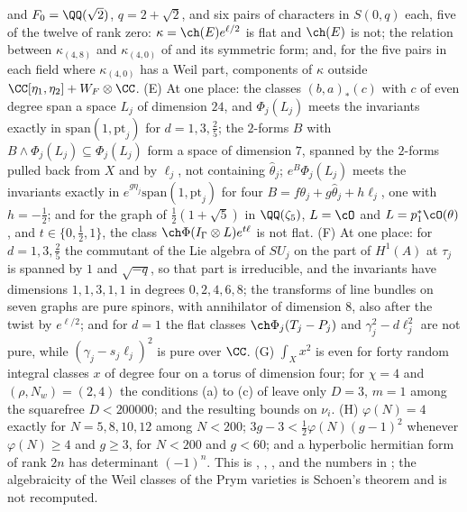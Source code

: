 \begin{enumerate}[label=\textup{(\Roman*)},leftmargin=*]
  and $F_{0}=\QQ(\sqrt2)$, $q=2+\sqrt2$, and six pairs of characters in
  $S(0,q)$ each, five of the twelve of rank zero: $\kappa=\ch(E)e^{\ell/2}$ is
  flat and $\ch(E)$ is not; the relation between $\kappa_{(4,8)}$ and
  $\kappa_{(4,0)}$ of  and its symmetric form;
  and, for the five pairs in each field where $\kappa_{(4,0)}$ has a Weil
  part, components of $\kappa$ outside $\CC[\eta_{1},\eta_{2}]+W_{F}\otimes\CC$.
  (E) At one place: the classes $(b,a)_{*}(c)$ with $c$ of even degree span a
  space $L_{j}$ of dimension $24$, and $\Phi_{j}(L_{j})$ meets the invariants
  exactly in $\mathrm{span}(1,\mathrm{pt}_{j})$ for $d=1,3,\frac25$; the
  $2$-forms $B$ with $B\wedge\Phi_{j}(L_{j})\subseteq\Phi_{j}(L_{j})$ form a
  space of dimension $7$, spanned by the $2$-forms pulled back from $X$ and
  by $\ell_{j}$, not containing $\widehat\theta_{j}$; $e^{B}\Phi_{j}(L_{j})$
  meets the invariants exactly in $e^{g\eta_{j}}\mathrm{span}(1,\mathrm{pt}_{j})$
  for four $B=f\theta_{j}+g\widehat\theta_{j}+h\ell_{j}$, one with
  $h=-\frac12$; and for the graph of $\frac12(1+\sqrt5)$ in $\QQ(\zeta_{5})$,
  $L=\cO$ and $L=p_{1}^{*}\cO(\theta)$, and $t\in\{0,\frac12,1\}$, the class
  $\ch\Phi(I_{\Gamma}\otimes L)e^{t\ell}$ is not flat. (F) At one place: for
  $d=1,3,\frac25$ the commutant of the Lie algebra of $SU_{j}$ on the part
  of $H^{1}(A)$ at $\tau_{j}$ is spanned by $1$ and $\sqrt{-q}$, so that part
  is irreducible, and the invariants have dimensions $1,1,3,1,1$ in degrees
  $0,2,4,6,8$; the transforms of line bundles on seven graphs are pure
  spinors, with annihilator of dimension $8$, also after the twist by
  $e^{\ell/2}$; and for $d=1$ the flat classes $\ch\Phi_{j}(T_{j}-P_{j})$ and
  $\gamma_{j}^{2}-d\ell_{j}^{2}$ are not pure, while
  $(\gamma_{j}-s_{j}\ell_{j})^{2}$ is pure over $\CC$. (G) $\int_{X}x^{2}$ is
  even for forty random integral classes $x$ of degree four on a torus of
  dimension four; for $\chi=4$ and $(\rho,N_{w})=(2,4)$ the conditions (a) to
  (c) of  leave only $D=3$, $m=1$ among the squarefree
  $D<200000$; and the resulting bounds on $\nu_{i}$. (H) $\varphi(N)=4$
  exactly for $N=5,8,10,12$ among $N<200$; $3g-3<\frac12\varphi(N)(g-1)^{2}$
  whenever $\varphi(N)\ge4$ and $g\ge3$, for $N<200$ and $g<60$; and a
  hyperbolic hermitian form of rank $2n$ has determinant $(-1)^{n}$. This is
  , ,
  ,  and the numbers
  in ; the algebraicity of the Weil classes of the Prym
  varieties is Schoen's theorem and is not recomputed.


\end{enumerate}
